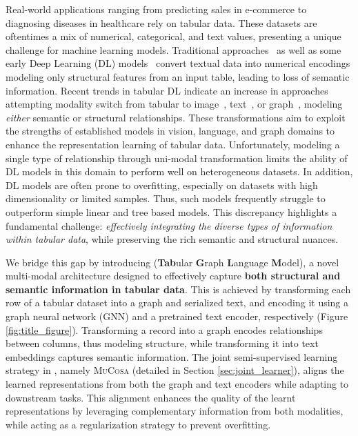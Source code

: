 Real-world applications ranging from predicting sales in e-commerce to diagnosing diseases in healthcare rely on tabular data. These datasets are oftentimes a mix of numerical, categorical, and text values, presenting a unique challenge for machine learning models. 
Traditional approaches~\cite{breiman2001random, chen2016xgboost, prokhorenkova2018catboost} as well as some early Deep Learning (DL) models~\cite{yoon2020vime, arik2021tabnet, gorishniy2021revisiting, hollmann2022tabpfn} convert textual data into numerical encodings modeling only structural features from an input table, leading to loss of semantic information.
Recent trends in tabular DL indicate an increase in approaches attempting modality switch from tabular to image~\cite{DeepInsight, wang2019supertml}, text~\cite{tabllm, arik2021tabnet}, or graph~\cite{ignnet, tabgnn}, modeling \textit{either} semantic or structural relationships. These transformations aim to exploit the strengths of established models in vision, language, and graph domains to enhance the representation learning of tabular data. 
Unfortunately, modeling a single type of relationship through uni-modal transformation limits the ability of DL models in this domain to perform well on heterogeneous datasets. In addition, DL models are often prone to overfitting, especially on datasets with high dimensionality or limited samples. Thus, such models frequently struggle to outperform simple linear and tree based models. This discrepancy highlights a fundamental challenge: \textit{effectively integrating the diverse types of information within tabular data}, while preserving the rich semantic and structural nuances.



We bridge this gap by introducing \textbf{\tabglm} (\textbf{Tab}ular \textbf{G}raph \textbf{L}anguage \textbf{M}odel), a novel multi-modal architecture designed to effectively capture \textbf{both structural and semantic information in tabular data}. This is achieved by transforming each row of a tabular dataset into a graph and serialized text, and encoding it using a graph neural network (GNN) and a pretrained text encoder, respectively (Figure \ref{fig:title_figure}). 
Transforming a record into a graph encodes relationships between columns, thus modeling structure, while transforming it into text embeddings captures semantic information.
The joint semi-supervised learning strategy in \tabglm, namely \textsc{MuCosa} (detailed in Section \ref{sec:joint_learner}), aligns the learned representations from both the graph and text encoders while adapting to downstream tasks.
This alignment enhances the quality of the learnt representations by leveraging complementary information from both modalities, while acting as a regularization strategy to prevent overfitting.


